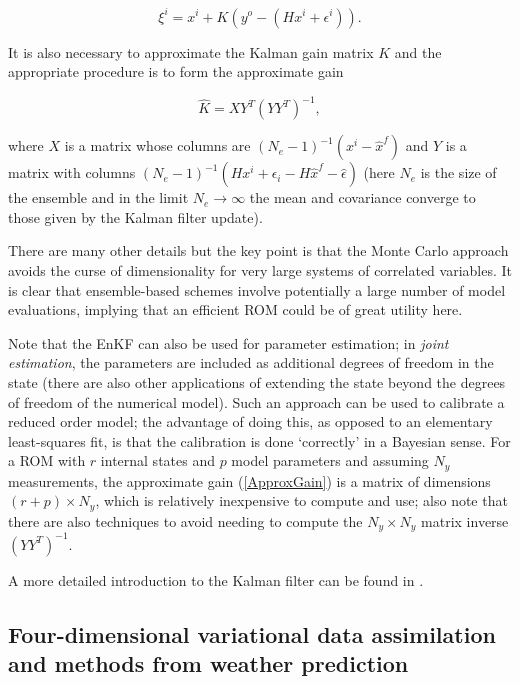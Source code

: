 \begin{equation}
\xi^i = x^i + K \left ( y^o - (H x^i + \epsilon^i) \right ).
\end{equation} 

It is also necessary to approximate the Kalman gain matrix $K$ and the appropriate procedure is to form the approximate gain

\begin{equation} \label{ApproxGain}
\hat{K} = X Y^T (Y Y^T)^{-1},
\end{equation}

where $X$ is a matrix whose columns are $(N_e-1)^{-1} \left ( x^i - \hat{x}^f \right )$ and $Y$ is a matrix with columns $(N_e-1)^{-1} \left ( H x^i + \epsilon_i - H \hat{x}^f -\hat{\epsilon} \right )$ (here $N_e$ is the size of the ensemble and in the limit $N_e \rightarrow \infty$ the mean and covariance converge to those given by the Kalman filter update).

There are many other details but the key point is that the Monte Carlo approach avoids the curse of dimensionality for very large systems of correlated variables.  
It is clear that ensemble-based schemes involve potentially a large number of model evaluations, implying that an efficient ROM could be of great utility here.

Note that the EnKF can also be used for parameter estimation; in {\it joint estimation}, the parameters are included as additional degrees of freedom in the state (there are also other applications of extending the state beyond the degrees of freedom of the numerical model).  
Such an approach can be used to calibrate a reduced order model; the advantage of doing this, as opposed to an elementary least-squares fit, is that the calibration is done `correctly' in a Bayesian sense.  
For a ROM with $r$ internal states and $p$ model parameters and assuming $N_y$ measurements, the approximate gain (\ref{ApproxGain}) is a matrix of dimensions $(r+p) \times N_y$, which is relatively inexpensive to compute and use; also note that there are also techniques to avoid needing to compute the $N_y \times N_y$ matrix inverse $\left ( Y Y^T \right )^{-1}$.

A more detailed introduction to the Kalman filter can be found in \cite{snyder2012}.

\subsection{Four-dimensional variational data assimilation and methods from weather prediction}

